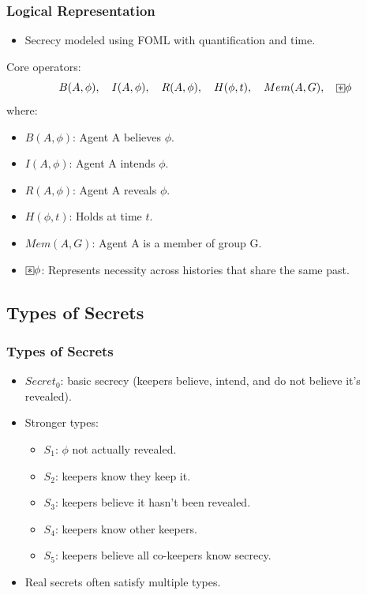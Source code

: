\documentclass[aspectratio=169]{beamer}
\newcommand{\BoxStar}{\fboxsep=1pt\fbox{$\ast$}}
\begin{document}
\begin{frame}
\frametitle{Logical Representation}
\begin{itemize}
    \item Secrecy modeled using FOML with quantification and time.
\end{itemize}
\begin{block}{Core operators:}
\[ 
B(A, \phi), \quad I(A, \phi), \quad R(A, \phi), \quad H(\phi, t), \quad Mem(A, G), \quad \BoxStar \phi 
\]
\normalsize where:
\begin{itemize}
    \item $B(A, \phi)$: Agent A believes $\phi$.
    \item $I(A, \phi)$: Agent A intends $\phi$.
    \item $R(A, \phi)$: Agent A reveals $\phi$.
    \item $H(\phi, t)$: Holds at time $t$.
    \item $Mem(A, G)$: Agent A is a member of group G.
    \item $\BoxStar \phi$: Represents necessity across histories that share the same past.
\end{itemize}
\end{block}
\end{frame}

\subsection{Types of Secrets}
\begin{frame}
\frametitle{Types of Secrets}
\Large
\begin{itemize}
    \item $Secret_0$: basic secrecy (keepers believe, intend, and do not believe it's revealed).
    \item Stronger types:
    \begin{itemize}
        \Large
        \item $S_1$: $\phi$ not actually revealed.
        \item $S_2$: keepers know they keep it.
        \item $S_3$: keepers believe it hasn't been revealed.
        \item $S_4$: keepers know other keepers.
        \item $S_5$: keepers believe all co-keepers know secrecy.
    \end{itemize}
    \item Real secrets often satisfy multiple types.
\end{itemize}
\end{frame}
\end{document}
